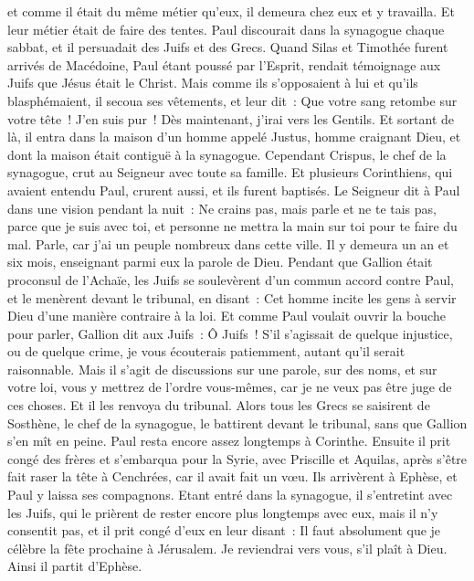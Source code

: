 \begin{multicols}{2}
et comme il était du même métier qu'eux, il demeura chez eux et y travailla. Et leur métier était de faire des tentes.
Paul discourait dans la synagogue chaque sabbat, et il persuadait des Juifs et des Grecs.
Quand Silas et Timothée furent arrivés de Macédoine, Paul étant poussé par l'Esprit, rendait témoignage aux Juifs que Jésus était le Christ.
Mais comme ils s'opposaient à lui et qu'ils blasphémaient, il secoua ses vêtements, et leur dit~: Que votre sang retombe sur votre tête~! J'en suis pur~! Dès maintenant, j'irai vers les Gentils.
Et sortant de là, il entra dans la maison d'un homme appelé Justus, homme craignant Dieu, et dont la maison était contiguë à la synagogue.
Cependant Crispus, le chef de la synagogue, crut au Seigneur avec toute sa famille. Et plusieurs Corinthiens, qui avaient entendu Paul, crurent aussi, et ils furent baptisés.
Le Seigneur dit à Paul dans une vision pendant la nuit~: Ne crains pas, mais parle et ne te tais pas,
parce que je suis avec toi, et personne ne mettra la main sur toi pour te faire du mal. Parle, car j'ai un peuple nombreux dans cette ville.
Il y demeura un an et six mois, enseignant parmi eux la parole de Dieu.
Pendant que Gallion était proconsul de l'Achaïe, les Juifs se soulevèrent d'un commun accord contre Paul, et le menèrent devant le tribunal,
en disant~: Cet homme incite les gens à servir Dieu d'une manière contraire à la loi.
Et comme Paul voulait ouvrir la bouche pour parler, Gallion dit aux Juifs~: Ô Juifs~! S'il s'agissait de quelque injustice, ou de quelque crime, je vous écouterais patiemment, autant qu'il serait raisonnable.
Mais il s'agit de discussions sur une parole, sur des noms, et sur votre loi, vous y mettrez de l'ordre vous-mêmes, car je ne veux pas être juge de ces choses.
Et il les renvoya du tribunal.
Alors tous les Grecs se saisirent de Sosthène, le chef de la synagogue, le battirent devant le tribunal, sans que Gallion s'en mît en peine.
Paul resta encore assez longtemps à Corinthe. Ensuite il prit congé des frères et s'embarqua pour la Syrie, avec Priscille et Aquilas, après s'être fait raser la tête à Cenchrées, car il avait fait un vœu.
Ils arrivèrent à Ephèse, et Paul y laissa ses compagnons. Etant entré dans la synagogue, il s'entretint avec les Juifs,
qui le prièrent de rester encore plus longtemps avec eux,
mais il n'y consentit pas, et il prit congé d'eux en leur disant~: Il faut absolument que je célèbre la fête prochaine à Jérusalem. Je reviendrai vers vous, s'il plaît à Dieu. Ainsi il partit d'Ephèse.

\end{multicols}
